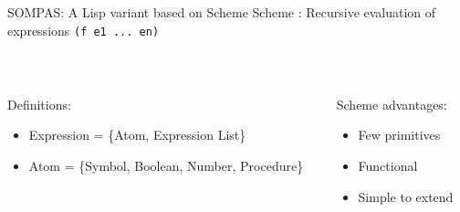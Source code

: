\begin{frame}[fragile]{SOMPAS: A Lisp variant based on Scheme}
    \centering
    Scheme : Recursive evaluation of expressions \verb|(f e1 ... en)|
    
    ~~

\pause
    \begin{columns}[t]
        \begin{column}{0.65\textwidth}
            Definitions:
            \begin{itemize}
                \item Expression = \{Atom, Expression List\}
                \item Atom = \{Symbol, Boolean, Number, Procedure\}
            \end{itemize}
\pause
        \end{column}
        \begin{column}{0.35\textwidth}
            Scheme advantages:
            \begin{itemize}
                \item Few primitives
                \item Functional
                \item Simple to extend
            \end{itemize}
        \end{column}
     \end{columns}
\end{frame}


